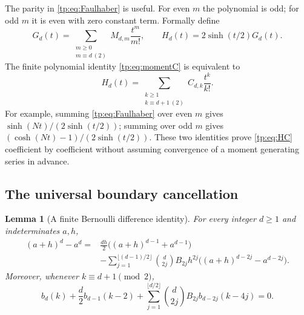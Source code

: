 \documentclass[11pt,a4paper]{article}
\numberwithin{equation}{section}
\newtheorem{lemma}[theorem]{Lemma}
\theoremstyle{definition}
\theoremstyle{remark}
\begin{document}
The parity in \eqref{tp:eq:Faulhaber} is useful.  For even $m$ the
polynomial is odd; for odd $m$ it is even with zero constant term.
Formally define
\begin{equation}\label{tp:eq:GH}
 G_d(t)=\sum_{\substack{m\geq0\\m\equiv d\ (2)}}M_{d,m}\frac{t^m}{m!},
 \qquad H_d(t)=2\sinh(t/2)G_d(t).
\end{equation}
The finite polynomial identity \eqref{tp:eq:momentC} is equivalent to
\begin{equation}\label{tp:eq:HC}
 H_d(t)=\sum_{\substack{k\geq1\\k\equiv d+1\ (2)}}C_{d,k}\frac{t^k}{k!}.
\end{equation}
For example, summing \eqref{tp:eq:Faulhaber} over even $m$ gives
$\sinh(Nt)/(2\sinh(t/2))$; summing over odd $m$ gives
$(\cosh(Nt)-1)/(2\sinh(t/2))$.  These two identities prove
\eqref{tp:eq:HC} coefficient by coefficient without assuming convergence
of a moment generating series in advance.

\subsection{The universal boundary cancellation}

\begin{lemma}[A finite Bernoulli difference identity]
\label{tp:lem:EM}
For every integer $d\geq1$ and indeterminates $a,h$,
\begin{equation}\label{tp:eq:EM}
 \begin{split}
 (a+h)^d-a^d={}&\frac{dh}{2}\bigl((a+h)^{d-1}+a^{d-1}\bigr)\\
 &-\sum_{j=1}^{\lfloor(d-1)/2\rfloor}
      \binom d{2j}B_{2j}h^{2j}
      \bigl((a+h)^{d-2j}-a^{d-2j}\bigr).
 \end{split}
\end{equation}
Moreover, whenever $k\equiv d+1\pmod2$,
\begin{equation}\label{tp:eq:boundary}
 b_d(k)+\frac d2 b_{d-1}(k-2)
 +\sum_{j=1}^{\lfloor d/2\rfloor}
      \binom d{2j}B_{2j}b_{d-2j}(k-4j)=0.
\end{equation}
\end{lemma}
\end{document}
